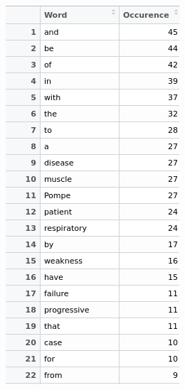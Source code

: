 \documentclass{article}
\begin{document}
 \includegraphics[width=0.6\linewidth]{word_occurence_pos_uni.png}\\
 
\end{document}
